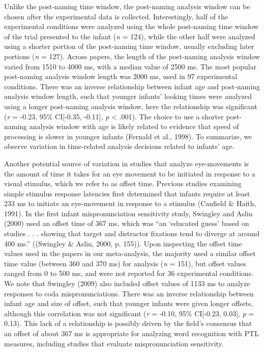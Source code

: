\documentclass[man]{apa6}
\theoremstyle{definition}
\theoremstyle{definition}
\theoremstyle{definition}
\theoremstyle{remark}
\begin{document}
Unlike the post-naming time window, the post-naming analysis window can
be chosen after the experimental data is collected. Interestingly, half
of the experimental conditions were analyzed using the whole post-naming
time window of the trial presented to the infant (\emph{n} = 124), while
the other half were analyzed using a shorter portion of the post-naming
time window, usually excluding later portions (\emph{n} = 127). Across
papers, the length of the post-naming analysis window varied from 1510
to 4000 ms, with a median value of 2500 ms. The most popular post-naming
analysis window length was 2000 ms, used in 97 experimental conditions.
There was an inverse relationship between infant age and post-naming
analysis window length, such that younger infants' looking times were
analyzed using a longer post-naming analysis window, here the
relationship was significant (\emph{r} = -0.23, 95\% CI{[}-0.35,
-0.11{]}, \emph{p} \textless{} .001). The choice to use a shorter
post-naming analysis window with age is likely related to evidence that
speed of processing is slower in younger infants (Fernald et al., 1998).
To summarize, we observe variation in time-related analysis decisions
related to infants' age.

Another potential source of variation in studies that analyze
eye-movements is the amount of time it takes for an eye movement to be
initiated in response to a visual stimulus, which we refer to as offset
time. Previous studies examining simple stimulus response latencies
first determined that infants require at least 233 ms to initiate an
eye-movement in response to a stimulus (Canfield \& Haith, 1991). In the
first infant mispronunciation sensitivity study, Swingley and Aslin
(2000) used an offset time of 367 ms, which was \enquote{an
\enquote{educated guess} based on studies . . . showing that target and
distractor fixations tend to diverge at around 400 ms.} ((Swingley \&
Aslin, 2000, p. 155)). Upon inspecting the offset time values used in
the papers in our meta-analysis, the majority used a similar offset time
value (between 360 and 370 ms) for analysis (\emph{n} = 151), but offset
values ranged from 0 to 500 ms, and were not reported for 36
experimental conditions. We note that Swingley (2009) also included
offset values of 1133 ms to analyze responses to coda mispronunciations.
There was an inverse relationship between infant age and size of offset,
such that younger infants were given longer offsets, although this
correlation was not significant (\emph{r} = -0.10, 95\% CI{[}-0.23,
0.03{]}, \emph{p} = 0.13). This lack of a relationship is possibly
driven by the field's consensus that an offset of about 367 ms is
appropriate for analyzing word recognition with PTL measures, including
studies that evaluate mispronunciation sensitivity.
\end{document}
